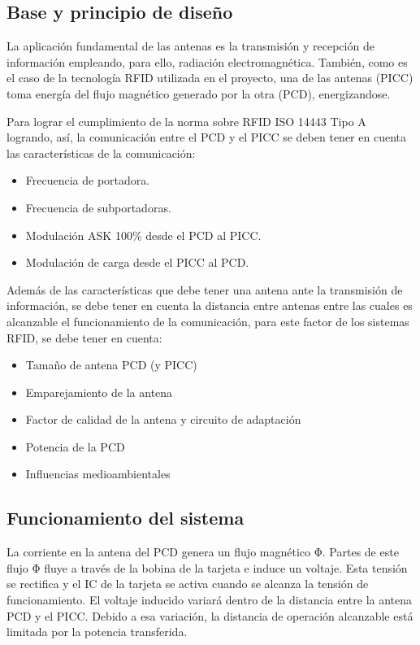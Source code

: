 \subsection{Base y principio de diseño}
La aplicación fundamental de las antenas es la transmisión y recepción de información empleando, para ello, radiación electromagnética. También, como es el caso de la tecnología RFID utilizada en el proyecto, una de las antenas (PICC) toma energía del flujo magnético generado por la otra (PCD), energizandose.

Para lograr el cumplimiento de la norma sobre RFID ISO 14443 Tipo A logrando, así, la comunicación entre el PCD y el PICC se deben tener en cuenta las características de la comunicación:

\begin{itemize}
\item Frecuencia de portadora.
\item Frecuencia de subportadoras.
\item Modulación ASK 100\% desde el PCD al PICC.
\item Modulación de carga desde el PICC al PCD.
\end{itemize}

Además de las características que debe tener una antena ante la transmisión de información, se debe tener en cuenta la distancia entre antenas entre las cuales es alcanzable el funcionamiento de la comunicación, para este factor de los sistemas RFID, se debe tener en cuenta:

\begin{itemize}
\item Tamaño de antena PCD (y PICC)
\item Emparejamiento de la antena
\item Factor de calidad de la antena y circuito de adaptación
\item Potencia de la PCD
\item Influencias medioambientales
\end{itemize}

\subsection{Funcionamiento del sistema}

La corriente en la antena del PCD genera un flujo magnético Φ. Partes de este flujo Φ fluye a través de la bobina de la tarjeta e induce un voltaje. Esta tensión se rectifica y el IC de la tarjeta se activa cuando se alcanza la tensión de funcionamiento.
El voltaje inducido variará dentro de la distancia entre la antena PCD y el PICC. Debido a esa variación, la distancia de operación alcanzable está limitada por la potencia transferida.

